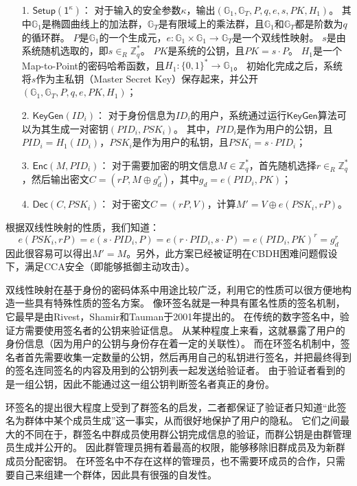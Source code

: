 \begin{itemize}
  \item[1.] $\mathsf{Setup(1^\kappa)}$： 对于输入的安全参数$\kappa$，输出$(\mathbb{G}_1,\mathbb{G}_T,P,q,e,s,PK,H_1)$。
  其中$\mathbb{G}_1$是椭圆曲线上的加法群，$\mathbb{G}_T$是有限域上的乘法群，且$\mathbb{G}_1$和$\mathbb{G}_T$都是阶数为$q$的循环群。
  $P$是$\mathbb{G}_1$的一个生成元，$e:\mathbb{G}_1\times\mathbb{G}_1\rightarrow \mathbb{G}_T$是一个双线性映射。
  $s$是由系统随机选取的，即$s\in_R \mathbb{Z}_q^*$。
  $PK$是系统的公钥，且$PK=s\cdot P$。
  $H_1$是一个Map-to-Point的密码哈希函数，且$H_1:\{0,1\}^*\rightarrow\mathbb{G}_1$。
  初始化完成之后，系统将$s$作为主私钥（Master Secret Key）保存起来，并公开$(\mathbb{G}_1,\mathbb{G}_T,P,q,e,PK,H_1)$；
  \item[2.] $\mathsf{KeyGen}(ID_i)$： 对于身份信息为$ID_i$的用户，系统通过运行$\mathsf{KeyGen}$算法可以为其生成一对密钥$(PID_i,PSK_i)$。
  其中，$PID_i$是作为用户的公钥，且$PID_i=H_1(ID_i)$，$PSK_i$是作为用户的私钥，且$PSK_i=s\cdot PID_i$；
  \item[3.] $\mathsf{Enc}(M,PID_i)$： 对于需要加密的明文信息$M\in\mathbb{Z}_q^*$，首先随机选择$r\in_R\mathbb{Z}_q^*$，然后输出密文$C=(rP,M\oplus g_d^r)$，其中$g_d=e(PID_i,PK)$；
  \item[4.] $\mathsf{Dec}(C,PSK_i)$： 对于密文$C=(rP,V)$，计算$M'=V\oplus e(PSK_i,rP)$。
\end{itemize}
根据双线性映射的性质，我们知道：
\begin{equation}
e(PSK_i,rP)=e(s\cdot PID_i, P)=e(r\cdot PID_i, s\cdot P)=e(PID_i,PK)^r=g_d^r
\end{equation}
因此很容易可以得出$M'=M$。另外，此方案已经被证明在CBDH困难问题假设下，满足CCA安全（即能够抵御主动攻击）。

双线性映射在基于身份的密码体系中用途比较广泛，利用它的性质可以很方便地构造一些具有特殊性质的签名方案。
像环签名就是一种具有匿名性质的签名机制，它最早是由Rivest，Shamir和Tauman于2001年提出的\cite{rivest2001leak}。
在传统的数字签名中，验证方需要使用签名者的公钥来验证信息。
从某种程度上来看，这就暴露了用户的身份信息（因为用户的公钥与身份存在着一定的关联性）。
而在环签名机制中，签名者首先需要收集一定数量的公钥，然后再用自己的私钥进行签名，并把最终得到的签名连同签名的内容及用到的公钥列表一起发送给验证者。
由于验证者看到的是一组公钥，因此不能通过这一组公钥判断签名者真正的身份。

环签名的提出很大程度上受到了群签名的启发\cite{chaum1991group}，二者都保证了验证者只知道“此签名为群体中某个成员生成”这一事实，从而很好地保护了用户的隐私。
它们之间最大的不同在于，群签名中群成员使用群公钥完成信息的验证，而群公钥是由群管理员生成并公开的。
因此群管理员拥有着最高的权限，能够移除旧群成员及为新群成员分配密钥。
在环签名中不存在这样的管理员，也不需要环成员的合作，只需要自己来组建一个群体，因此具有很强的自发性。

